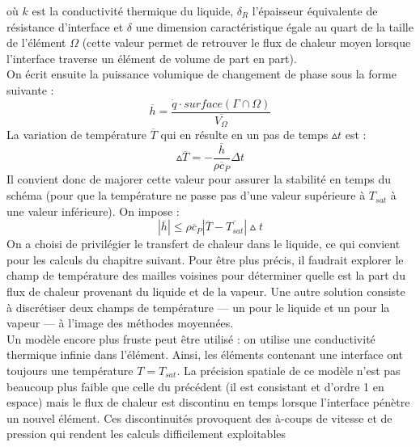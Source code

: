 o\`u $k$ est la conductivit\'e thermique du liquide, $\delta_{R}$ l’\'epaisseur \'equivalente de r\'esistance d’interface et $\delta$ une dimension caract\'eristique \'egale au quart de la taille de l’\'el\'ement $\Omega$ (cette valeur permet de retrouver le flux de chaleur moyen lorsque l’interface traverse un \'el\'ement de volume de part en part).\\
On \'ecrit ensuite la puissance volumique de changement de phase sous la forme
suivante :
\begin{equation}
\overline{h} \hat{=} \dfrac{\dot{q} \cdot surface(\Gamma \cap \Omega)}{\overline{V_{\Omega}}}
\end{equation}
La variation de temp\'erature $\overline{T}$ qui en r\'esulte en un pas de temps $\vartriangle t$ est :
\begin{equation}
\vartriangle \overline{T} = - \dfrac{\overline{h}}{\overline{\rho c_{P}}} \Delta t
\end{equation}
Il convient donc de majorer cette valeur pour assurer la stabilit\'e en temps du sch\'ema (pour que la temp\'erature ne passe pas d’une valeur sup\'erieure \`a $T_{sat}$ \`a une valeur inf\'erieure). On impose :
\begin{equation}
|\overline{h}| \leq \overline{\rho c_{P}} | \overline{T} - \overline{T_{sat}}| \vartriangle t
\end{equation}
On a choisi de privil\'egier le transfert de chaleur dans le liquide, ce qui convient pour les calculs du chapitre suivant. Pour \^etre plus pr\'ecis, il faudrait explorer le champ de temp\'erature des mailles voisines pour d\'eterminer quelle est la part du flux de chaleur provenant du liquide et de la vapeur. Une autre solution consiste \`a discr\'etiser deux champs de temp\'erature — un pour le liquide et un pour la vapeur — \`a l’image des m\'ethodes moyenn\'ees.\\
Un mod\`ele encore plus fruste peut \^etre utilis\'e : on utilise une conductivit\'e thermique infinie dans l’\'el\'ement. Ainsi, les \'el\'ements contenant une interface ont toujours une temp\'erature $T = T_{sat}$. La pr\'ecision spatiale de ce mod\`ele n’est pas beaucoup plus faible que celle du pr\'ec\'edent (il est consistant et d’ordre 1 en espace) mais le flux de chaleur est discontinu en temps lorsque l’interface p\'enètre un nouvel \'el\'ement. Ces discontinuit\'es provoquent des \`a-coups de vitesse et de pression qui rendent les calculs difficilement exploitables\smallskip \\

